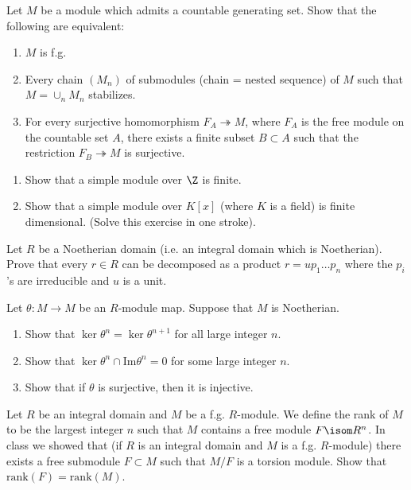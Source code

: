 \begin{problem}
Let \( M \) be a module which admits a countable generating set. Show that the following are equivalent:
\begin{enumerate}[1]
\item
\( M \) is f.g.
\item
Every chain \( (M_n) \) of submodules (chain = nested sequence) of \( M \) such that \( M = \cup_n M_n \) stabilizes.
\item
For every surjective homomorphism \( F_A \twoheadrightarrow M \), where \( F_A \) is the free module on the countable set \( A \), there exists a finite subset \( B \subset A \) such that the restriction \( F_B \twoheadrightarrow M \) is surjective.
\end{enumerate}
\end{problem}

\begin{problem}
\begin{enumerate}[1]
\item
Show that a simple module over \( \Z \) is finite.
\item
Show that a simple module over \( K[x] \) (where \( K \) is a field) is finite dimensional.
(Solve this exercise in one stroke).
\end{enumerate}
\end{problem}

\begin{problem}
Let \( R \) be a Noetherian domain (i.e. an integral domain which is Noetherian). Prove that every \( r \in R \) can be decomposed as a product \( r = up_1 \dots p_n \) where the \( p_i\)'s are irreducible and \( u \) is a unit.
\end{problem}

\begin{problem}
Let \( \theta : M \to M \) be an \( R \)-module map. Suppose that \( M \) is Noetherian.
\begin{enumerate}[1]
\item
Show that \( \ker \theta^n = \ker \theta^{n+1} \) for all large integer \( n \).
\item
Show that \( \ker \theta^n \cap \mathrm{Im} \theta^n = 0 \) for some large integer \( n \).
\item
Show that if \( \theta \) is surjective, then it is injective.
\end{enumerate}
\end{problem}

\begin{problem}
Let \( R \) be an integral domain and \( M \) be a f.g. \( R \)-module. We define the rank of \( M \) to be the largest integer \( n \) such that \( M \) contains a free module \( F \isom R^n \). In class we showed that (if \( R \) is an integral domain and \( M \) is a f.g. \( R \)-module) there exists a free submodule \( F \subset M \) such that \( M/F \) is a torsion module. Show that \( \mathrm{rank}(F) =  \mathrm{rank}(M) \).
\end{problem}
